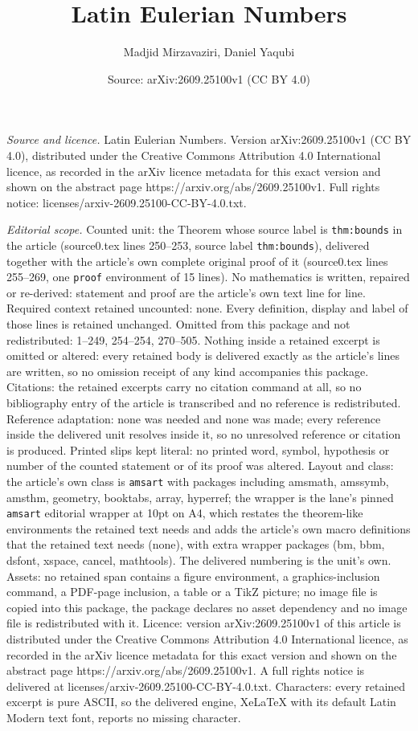 \documentclass[10pt,a4paper]{amsart}
\title[Latin Eulerian Numbers]{Latin Eulerian Numbers}
\author{Madjid Mirzavaziri, Daniel Yaqubi}
\date{Source: arXiv:2609.25100v1 (CC BY 4.0)}
\begin{document}
\maketitle

\noindent\emph{Source and licence.} Latin Eulerian Numbers. Version arXiv:2609.25100v1 (CC BY 4.0), distributed under the Creative Commons Attribution 4.0 International licence, as recorded in the arXiv licence metadata for this exact version and shown on the abstract page https://arxiv.org/abs/2609.25100v1. Full rights notice: licenses/arxiv-2609.25100-CC-BY-4.0.txt.\par\smallskip

\noindent\textit{Editorial scope.} Counted unit: the Theorem whose source label is \texttt{thm:bounds} in the article (source0.tex lines 250--253, source label \texttt{thm:bounds}), delivered together with the article's own complete original proof of it (source0.tex lines 255--269, one \texttt{proof} environment of 15 lines). No mathematics is written, repaired or re-derived: statement and proof are the article's own text line for line. Required context retained uncounted: none. Every definition, display and label of those lines is retained unchanged. Omitted from this package and not redistributed: 1--249, 254--254, 270--505. Nothing inside a retained excerpt is omitted or altered: every retained body is delivered exactly as the article's lines are written, so no omission receipt of any kind accompanies this package. Citations: the retained excerpts carry no citation command at all, so no bibliography entry of the article is transcribed and no reference is redistributed. Reference adaptation: none was needed and none was made; every reference inside the delivered unit resolves inside it, so no unresolved reference or citation is produced. Printed slips kept literal: no printed word, symbol, hypothesis or number of the counted statement or of its proof was altered. Layout and class: the article's own class is \texttt{amsart} with packages including amsmath, amssymb, amsthm, geometry, booktabs, array, hyperref; the wrapper is the lane's pinned \texttt{amsart} editorial wrapper at 10pt on A4, which restates the theorem-like environments the retained text needs and adds the article's own macro definitions that the retained text needs (none), with extra wrapper packages (bm, bbm, dsfont, xspace, cancel, mathtools). The delivered numbering is the unit's own. Assets: no retained span contains a figure environment, a graphics-inclusion command, a PDF-page inclusion, a table or a TikZ picture; no image file is copied into this package, the package declares no asset dependency and no image file is redistributed with it. Licence: version arXiv:2609.25100v1 of this article is distributed under the Creative Commons Attribution 4.0 International licence, as recorded in the arXiv licence metadata for this exact version and shown on the abstract page https://arxiv.org/abs/2609.25100v1. A full rights notice is delivered at licenses/arxiv-2609.25100-CC-BY-4.0.txt. Characters: every retained excerpt is pure ASCII, so the delivered engine, XeLaTeX with its default Latin Modern text font, reports no missing character.
\end{document}
